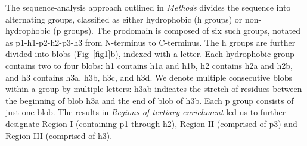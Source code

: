 \documentclass[10pt,letterpaper]{article}
\begin{document}
The sequence-analysis approach outlined in {\it Methods} divides the sequence into alternating groups, classified as either hydrophobic (h groups) or non-hydrophobic (p groups). The prodomain is composed of six such groups, notated as p1-h1-p2-h2-p3-h3 from N-terminus to C-terminus. The h groups are further divided into blobs (Fig~\ref{fig1}b), indexed with a letter. Each hydrophobic group contains two to four blobs: h1 contains h1a and h1b, h2 contains h2a and h2b, and h3 contains h3a, h3b, h3c, and h3d. We denote multiple consecutive blobs within a group by multiple letters: h3ab indicates the stretch of residues between the beginning of blob h3a and the end of blob of h3b. Each p group consists of just one blob. The results in {\it Regions of tertiary enrichment} led us to further designate Region I (containing p1 through h2), Region II (comprised of p3) and Region III (comprised of h3).
\end{document}
